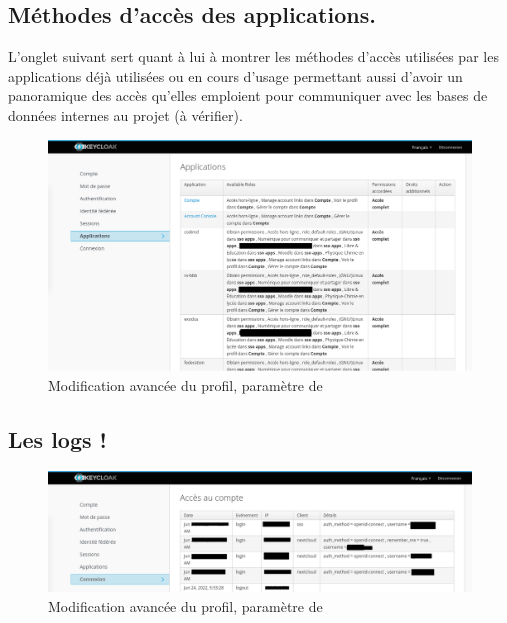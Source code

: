 \subsection{Méthodes d'accès des applications.}
L'onglet suivant sert quant à lui à montrer les méthodes d'accès utilisées par les applications déjà utilisées ou en cours d'usage permettant aussi d'avoir un panoramique des accès qu'elles emploient pour communiquer avec les bases de données internes au projet (à vérifier).
\begin{figure}
	\centering
	\includegraphics{./Captures/keycloack.profil.applications.png}
	\caption{Modification avancée du profil, paramètre de }
\end{figure}

\subsection{Les logs !}
\begin{figure}
	\centering
	\includegraphics{./Captures/keycloack.profil.connexions.log.png}
	\caption{Modification avancée du profil, paramètre de }
\end{figure}
